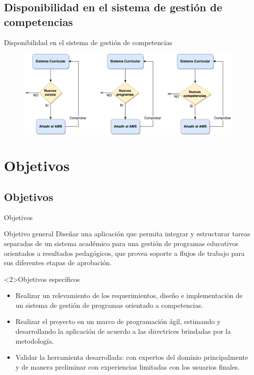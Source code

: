 \documentclass[10pt,xcolor=table]{beamer}
\begin{document}
\subsection{Disponibilidad en el sistema de gestión de competencias}
\begin{frame}{Disponibilidad en el sistema de gestión de competencias}
	\begin{figure}
		\centering
	    \includegraphics[scale=0.35]{../Figuras/after_creation}
	\end{figure}
\end{frame}

\section{Objetivos}
\subsection{Objetivos}
\begin{frame}[t]{Objetivos}
	\begin{alertblock}{Objetivo general}
        Diseñar una aplicación que permita integrar y estructurar tareas separadas de un sistema académico para una gestión de programas educativos orientados a resultados pedagógicos, que provea soporte a flujos de trabajo para sus diferentes etapas de aprobación.
      \end{alertblock}

	\begin{alertblock}{Objetivos específicos}
        \begin{itemize}
        	\item Realizar un relevamiento de los requerimientos, diseño e implementación de un sistema de gestión de programas orientado a competencias.
        	\item Realizar el proyecto en un marco de programación ágil, estimando y desarrollando la aplicación de acuerdo a las directrices brindadas por la metodología.
        	\item Validar la herramienta desarrollada: con expertos del dominio principalmente y de manera preliminar con experiencias limitadas con los usuarios finales.
        \end{itemize}
    \end{alertblock}
\end{frame}
\end{document}
